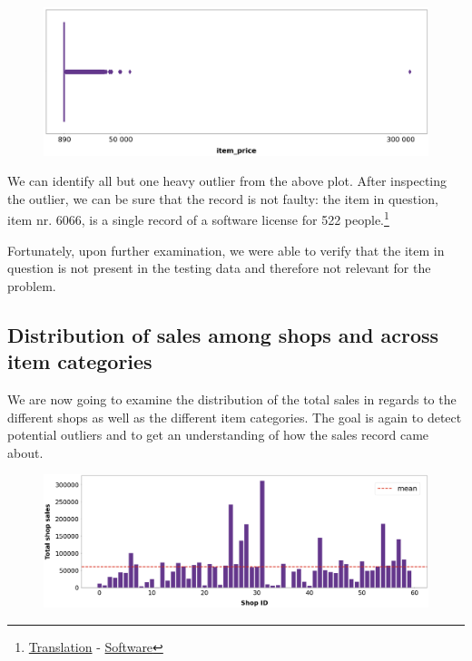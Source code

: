 \begin{figure}[h]
  \centering
  \includegraphics[width=0.8\linewidth]{external_content/graphs/outliers-item_price.png}
  \captionsetup{justification=centering}
  \label{fig:item_price_outliers}
\end{figure}

We can identify all but one heavy outlier from the above plot. After inspecting the outlier, we can be sure that the record is not faulty: the item in question, item nr. 6066, is a single record of a software license for 522 people.\footnote{\href{https://translate.google.com/?sl=ru&tl=en&text=Radmin\%203\%20\%20-\%20522\%20\%D0\%BB\%D0\%B8\%D1\%86.&op=translate }{Translation} - \href{https://www.radmin.com/ordering/}{Software}}

Fortunately, upon further examination, we were able to verify that the item in question is not present in the testing data and therefore not relevant for the problem.

\subsection{Distribution of sales among shops and across item categories}

We are now going to examine the distribution of the total sales in regards to the different shops as well as the different item categories. The goal is again to detect potential outliers and to get an understanding of how the sales record came about.

\begin{figure}[h]
  \centering
  \includegraphics[width=0.8\linewidth]{external_content/graphs/distribution_amongst_shops.png}
  \captionsetup{justification=centering}
  \label{fig:distribution_amongst_shops}
\end{figure}

